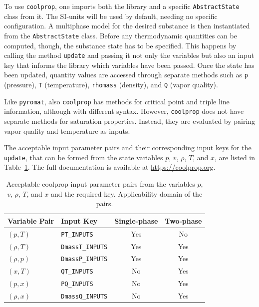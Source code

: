 To use \verb|coolprop|, one imports both the library and a specific \verb|AbstractState| class from it. The SI-units will be used by default, needing no specific configuration. A multiphase model for the desired substance is then instantiated from the \verb|AbstractState| class. Before any thermodynamic quantities can be computed, though, the substance state has to be specified. This happens by calling the method \verb|update| and passing it not only the variables but also an input key that informs the library which variables have been passed. Once the state has been updated, quantity values are accessed through separate methods such as \verb|p| (pressure), \verb|T| (temperature), \verb|rhomass| (density), and \verb|Q| (vapor quality).

Like \verb|pyromat|, also \verb|coolprop| has methods for critical point and triple line information, although with different syntax. However, \verb|coolprop| does not have separate methods for saturation properties. Instead, they are evaluated by pairing vapor quality and temperature as inputs.

The acceptable input parameter pairs and their corresponding input keys for the \verb|update|, that can be formed from the state variables $p$, $v$, $\rho$, $T$, and $x$, are listed in Table~\ref{tab:coolprop-pvTx-input-pairs}. The full documentation is available at \href{https://coolprop.org}{https://coolprop.org}.
\begin{table}[!htb]
    \centering
    \begin{threeparttable}
    \caption{Acceptable coolprop input parameter pairs from the variables $p$, $v$, $\rho$, $T$, and $x$ and the required key. Applicability domain of the pairs.}
    \begin{tabular}{llcc}
    \toprule 
    Variable Pair & Input Key & Single-phase & Two-phase\\
    \midrule 
    $(p, T)$ & \texttt{PT\_INPUTS} & Yes & No \\
    $(\rho, T)$ & \texttt{DmassT\_INPUTS} & Yes & Yes \\
    $(\rho, p)$ & \texttt{DmassP\_INPUTS} & Yes & Yes \\
    $(x, T)$ & \texttt{QT\_INPUTS} & No & Yes \\
    $(p, x)$ & \texttt{PQ\_INPUTS} & No & Yes \\
    $(\rho, x)$ & \texttt{DmassQ\_INPUTS} & No & Yes \\
    \bottomrule
    \end{tabular}
    \end{threeparttable}
    \label{tab:coolprop-pvTx-input-pairs}
\end{table}

